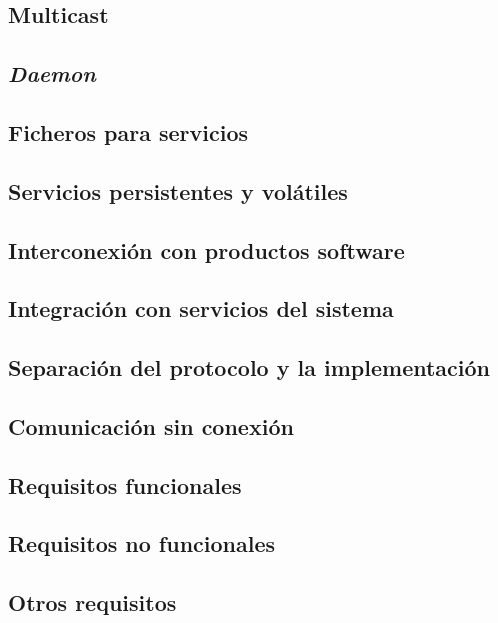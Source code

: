 \subsection{Multicast}

\subsection{\textit{Daemon}}

\subsection{Ficheros para servicios}

\subsection{Servicios persistentes y volátiles}

\subsection{Interconexión con productos software}

\subsection{Integración con servicios del sistema}

\subsection{Separación del protocolo y la implementación}

\subsection{Comunicación sin conexión}



\subsection{Requisitos funcionales}

\subsection{Requisitos no funcionales}

\subsection{Otros requisitos}

